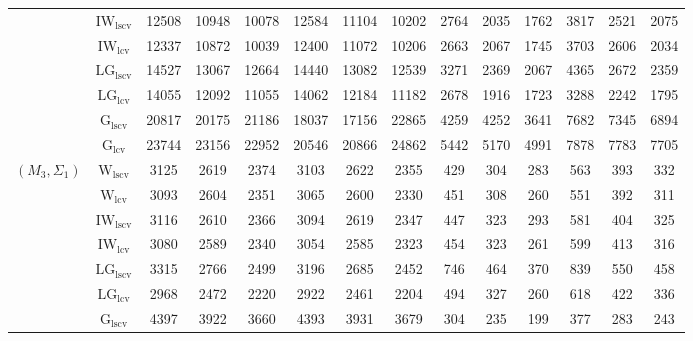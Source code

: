 \begin{table}[!ht]
{\begin{tabular}{@{}cc|ccc|ccc|ccc|ccc@{}}
 & $\mathrm{IW}_{\mathrm{lscv}}$ & \cellcolor{black!10}12508 & \cellcolor{black!10}10948 & \cellcolor{black!10}10078 & \cellcolor{black!10}12584 & \cellcolor{black!10}11104 & \cellcolor{black!30}10202 & 2764 & 2035 & 1762 & 3817 & 2521 & 2075 \\ 
 & $\mathrm{IW}_{\mathrm{lcv}}$ & \cellcolor{black!30}12337 & \cellcolor{black!30}10872 & \cellcolor{black!30}10039 & \cellcolor{black!30}12400 & \cellcolor{black!30}11072 & \cellcolor{black!10}10206 & 2663 & 2067 & 1745 & 3703 & 2606 & 2034 \\ 
 & $\mathrm{LG}_{\mathrm{lscv}}$ & 14527 & 13067 & 12664 & 14440 & 13082 & 12539 & 3271 & 2369 & 2067 & 4365 & 2672 & 2359 \\ 
 & $\mathrm{LG}_{\mathrm{lcv}}$ & 14055 & 12092 & 11055 & 14062 & 12184 & 11182 & 2678 & 1916 & 1723 & 3288 & 2242 & \cellcolor{black!10}1795 \\ 
 & $\mathrm{G}_{\mathrm{lscv}}$ & 20817 & 20175 & 21186 & 18037 & 17156 & 22865 & 4259 & 4252 & 3641 & 7682 & 7345 & 6894 \\ 
 & $\mathrm{G}_{\mathrm{lcv}}$ & 23744 & 23156 & 22952 & 20546 & 20866 & 24862 & 5442 & 5170 & 4991 & 7878 & 7783 & 7705 \\ 
\midrule
$(M_3,\Sigma_1)$ & $\mathrm{W}_{\mathrm{lscv}}$ & 3125 & 2619 & 2374 & 3103 & 2622 & 2355 & \cellcolor{black!10}429 & \cellcolor{black!10}304 & 283 & 563 & 393 & 332 \\ 
 & $\mathrm{W}_{\mathrm{lcv}}$ & 3093 & 2604 & 2351 & 3065 & 2600 & 2330 & 451 & 308 & 260 & \cellcolor{black!10}551 & \cellcolor{black!10}392 & \cellcolor{black!10}311 \\ 
 & $\mathrm{IW}_{\mathrm{lscv}}$ & 3116 & 2610 & 2366 & 3094 & 2619 & 2347 & 447 & 323 & 293 & 581 & 404 & 325 \\ 
 & $\mathrm{IW}_{\mathrm{lcv}}$ & \cellcolor{black!10}3080 & \cellcolor{black!10}2589 & \cellcolor{black!10}2340 & \cellcolor{black!10}3054 & \cellcolor{black!10}2585 & \cellcolor{black!10}2323 & 454 & 323 & 261 & 599 & 413 & 316 \\ 
 & $\mathrm{LG}_{\mathrm{lscv}}$ & 3315 & 2766 & 2499 & 3196 & 2685 & 2452 & 746 & 464 & 370 & 839 & 550 & 458 \\ 
 & $\mathrm{LG}_{\mathrm{lcv}}$ & \cellcolor{black!30}2968 & \cellcolor{black!30}2472 & \cellcolor{black!30}2220 & \cellcolor{black!30}2922 & \cellcolor{black!30}2461 & \cellcolor{black!30}2204 & 494 & 327 & \cellcolor{black!10}260 & 618 & 422 & 336 \\ 
 & $\mathrm{G}_{\mathrm{lscv}}$ & 4397 & 3922 & 3660 & 4393 & 3931 & 3679 & \cellcolor{black!30}304 & \cellcolor{black!30}235 & \cellcolor{black!30}199 & \cellcolor{black!30}377 & \cellcolor{black!30}283 & \cellcolor{black!30}243 \\ 

\end{tabular}}
\end{table}
